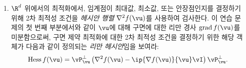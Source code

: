 \documentclass[../../book-main_ko.tex]{subfiles}
\begin{document}
\begin{exercise}
\begin{enumerate}
        \begin{equation*}
            \mathrm{grad}\, f(\vu) = \mathbf{0}.
        \end{equation*}
        기하학적으로, 이것은 $\vu$에서 $f$의 유클리드 경사가 $\vu$에서 구면에 대한 접공간에 직교해야 함을 말한다. 이제 $\vv \in \R^d$가 영이 아니라고 가정하자. 다음을 보여라:
        \begin{equation*}
            \mathrm{proj}_{\bS^{d-1}}(\vv) \doteq
            \min_{\norm{\vu}_2^2 = 1}\, \norm{\vu - \vv}_2
            =
            \frac{\vv}{\norm{\vv}_2},
        \end{equation*}
        1차 최적성 조건을 사용하여.
        \item $\R^d$ 위에서의 최적화에서, 임계점이 최대값, 최소값, 또는 안장점인지를 결정하기 위해 2차 최적성 조건을 \textit{헤시안 행렬} $\nabla^2 f(\vu)$를 사용하여 검사한다. 이 연습 문제의 첫 번째 부분에서와 같이 $\vu$에 대해 구면에 대한 리만 경사 $\mathrm{grad}\, f(\vu)$를 미분함으로써, 구면 제약 최적화에 대한 2차 최적성 조건을 결정하기 위한 해당 객체가 다음과 같이 정의되는 \textit{리만 헤시안}임을 보여라:
        \begin{equation}\label{eq:exercise-riemann-hess-sphere}
            \mathrm{Hess}\, f(\vu) = \vP_{\vu}^\perp \left(
            \nabla^2 f(\vu) - \ip{\nabla f(\vu)}{\vu} \vI
            \right) \vP_{\vu}^\perp.
        \end{equation}
    \end{enumerate}
\end{exercise}
\end{document}
